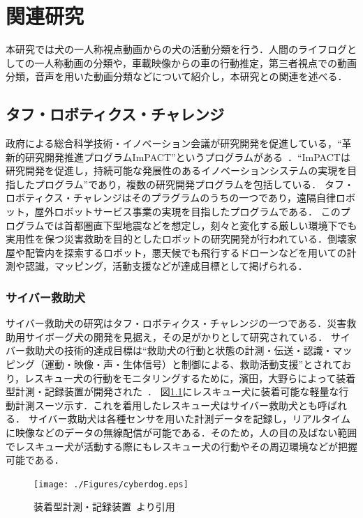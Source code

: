 \chapter{関連研究}
本研究では犬の一人称視点動画からの犬の活動分類を行う．人間のライフログとしての一人称動画の分類や，車載映像からの車の行動推定，第三者視点での動画分類，音声を用いた動画分類などについて紹介し，本研究との関連を述べる．

\section{タフ・ロボティクス・チャレンジ}
政府による総合科学技術・イノベーション会議が研究開発を促進している，``革新的研究開発推進プログラムImPACT''というプログラムがある~\cite{impact}．``ImPACTは研究開発を促進し，持続可能な発展性のあるイノベーションシステムの実現を目指したプログラム''であり，複数の研究開発プログラムを包括している．
タフ・ロボティクス・チャレンジはそのプラグラムのうちの一つであり，遠隔自律ロボット，屋外ロボットサービス事業の実現を目指したプログラムである．
このプログラムでは首都圏直下型地震などを想定し，刻々と変化する厳しい環境下でも実用性を保つ災害救助を目的としたロボットの研究開発が行われている．倒壊家屋や配管内を探索するロボット，悪天候でも飛行するドローンなどを用いての計測や認識，マッピング，活動支援などが達成目標として掲げられる．

\subsection{サイバー救助犬}
サイバー救助犬の研究はタフ・ロボティクス・チャレンジの一つである．災害救助用サイボーグ犬の開発を見据え，その足がかりとして研究されている．
サイバー救助犬の技術的達成目標は``救助犬の行動と状態の計測・伝送・認識・マッピング（運動・映像・声・生体信号）と制御による、救助活動支援''とされており，レスキュー犬の行動をモニタリングするために，濱田，大野らによって装着型計測・記録装置が開発された~\cite{dog01}．
図\ref{cyberdog}にレスキュー犬に装着可能な軽量な行動計測スーツ示す．これを着用したレスキュー犬はサイバー救助犬とも呼ばれる．
サイバー救助犬は各種センサを用いた計測データを記録し，リアルタイムに映像などのデータの無線配信が可能である．そのため，人の目の及ばない範囲でレスキュー犬が活動する際にもレスキュー犬の行動やその周辺環境などが把握可能である．

\begin{figure}[htbp]
 \begin{center}
  \texttt{[image: ./Figures/cyberdog.eps]}
  \caption{装着型計測・記録装置~\cite{dog01}より引用}
  \label{cyberdog}
 \end{center}
\end{figure}


